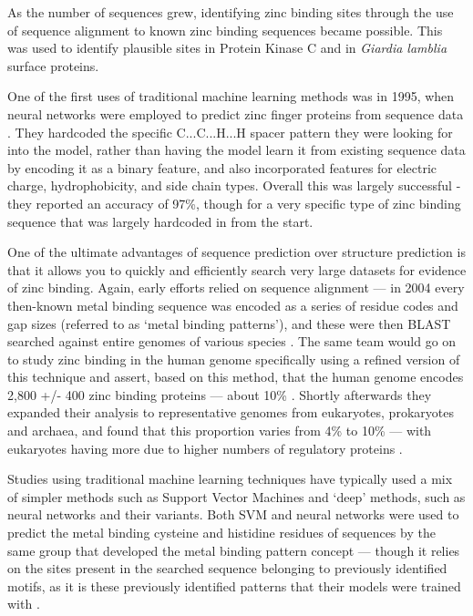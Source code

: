 As the number of sequences grew, identifying zinc binding sites through the use of sequence alignment to known zinc binding sequences became possible. This was used to identify plausible sites in Protein Kinase C \cite{bishop1991identification} and in {\it Giardia lamblia} surface proteins.

One of the first uses of traditional machine learning methods was in 1995, when neural networks were employed to predict zinc finger proteins from sequence data \cite{nakata1995prediction}. They hardcoded the specific C...C...H...H spacer pattern they were looking for into the model, rather than having the model learn it from existing sequence data by encoding it as a binary feature, and also incorporated features for electric charge, hydrophobicity, and side chain types. Overall this was largely successful - they reported an accuracy of 97\%, though for a very specific type of zinc binding sequence that was largely hardcoded in from the start.

One of the ultimate advantages of sequence prediction over structure prediction is that it allows you to quickly and efficiently search very large datasets for evidence of zinc binding. Again, early efforts relied on sequence alignment --- in 2004 every then-known metal binding sequence was encoded as a series of residue codes and gap sizes (referred to as `metal binding patterns'), and these were then BLAST searched against entire genomes of various species \cite{andreini2004hint}. The same team would go on to study zinc binding in the human genome specifically using a refined version of this technique and assert, based on this method, that the human genome encodes 2,800 +/- 400 zinc binding proteins --- about 10\% \cite{andreini2006counting}. Shortly afterwards they expanded their analysis to representative genomes from eukaryotes, prokaryotes and archaea, and found that this proportion varies from 4\% to 10\% --- with eukaryotes having more due to higher numbers of regulatory proteins \cite{passerini2007predicting}.

Studies using traditional machine learning techniques have typically used a mix of simpler methods such as Support Vector Machines and `deep' methods, such as neural networks and their variants. Both SVM and neural networks were used to predict the metal binding cysteine and histidine residues of sequences by the same group that developed the metal binding pattern concept --- though it relies on the sites present in the searched sequence belonging to previously identified motifs, as it is these previously identified patterns that their models were trained with \cite{passerini2006identifying}.

